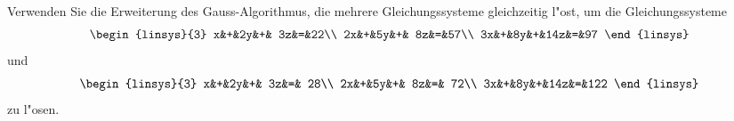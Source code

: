 Verwenden Sie die Erweiterung des Gauss-Algorithmus, die mehrere 
Gleichungssysteme gleichzeitig l"ost, um die Gleichungssysteme
\begin{equation}
\begin{linsys}{3}
 x&+&2y&+& 3z&=&22\\
2x&+&5y&+& 8z&=&57\\
3x&+&8y&+&14z&=&97
\end{linsys}
\end{equation}
und
\begin{equation}
\begin{linsys}{3}
 x&+&2y&+& 3z&=& 28\\
2x&+&5y&+& 8z&=& 72\\
3x&+&8y&+&14z&=&122
\end{linsys}
\end{equation}
zu l"osen.


